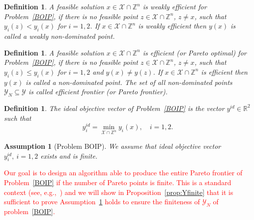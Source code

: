 \documentclass[preprint,12pt]{elsarticle}
\newcommand{\red}[1]{\textcolor{red}{#1}}
\newtheorem{definition}[theorem]{Definition}
\newtheorem{assumption}[theorem]{Assumption}
\def\R{\mathbb{R}}
\def\Z{\mathbb{Z}}
\begin{document}
\begin{definition}
 A feasible solution $x \in \mathcal{X}\cap \Z^n$ is weakly efficient for Problem~\eqref{BOIP}, if there is no
 feasible point $z\in \mathcal{X}\cap \Z^n$, $z\neq x$, such that $y_i(z) < y_i(x)$ for $i=1,2$.
 If $x \in \mathcal{X}\cap \Z^n$ is weakly efficient then $y(x)$ is called a weakly non-dominated point.
\end{definition}


\begin{definition}\label{def:dominated}
A feasible solution $x \in \mathcal{X}\cap \Z^n$ is efficient (or Pareto optimal) for Problem~\eqref{BOIP}, if there is no feasible point $z\in \mathcal{X}\cap \Z^n$, $z\neq x$,
such that $y_i(z) \leq y_i(x)$ for $i=1,2$ and $y(x) \neq y(z)$. If $x \in \mathcal{X}\cap \Z^n$ is efficient then $y(x)$ is called a non-dominated point.
 The set of all non-dominated points $\mathcal{Y}_N\subseteq \mathcal{Y}$ is called efficient frontier (or Pareto frontier).
\end{definition}

\begin{definition}\label{def:ideal}
 The \emph{ideal} objective vector of Problem~\eqref{BOIP} is the vector $y^{id}\in \R^2$ such that
 \[y_i^{id} = \min_{\mathcal{X}\cap \Z^n} y_i(x), \quad i=1,2.\]\end{definition}


\begin{assumption}[Problem BOIP]\label{ass:boip}
We assume that ideal objective vector $y_i^{id},\  i=1,2$
exists  and is finite.
\end{assumption}




\red{Our goal is to design an algorithm able to produce the entire Pareto frontier of Problem~\eqref{BOIP} if the number of Pareto points is finite. This is a standard context (see, e.g.,~\cite{ralphs2006improved}) and we will show in
Proposition~\ref{prop:Yfinite}  that it is sufficient to prove 
Assumption~\ref{ass:boip} holds to ensure the finiteness of $\mathcal{Y}_N$ of problem~\eqref{BOIP}.}
\end{document}

